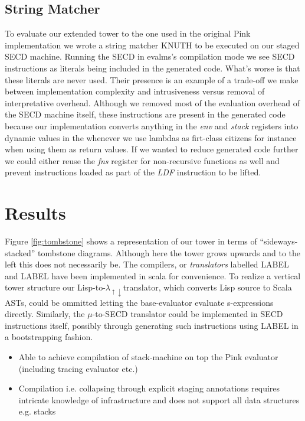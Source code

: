 \documentclass{article}
\theoremstyle{definition}
\newcommand{\mslang}{$\lambda_{\uparrow\downarrow}$}
\begin{document}
\subsection{String Matcher}
To evaluate our extended tower to the one used in the original Pink implementation we wrote a string matcher KNUTH to be executed on our staged SECD machine. Running the SECD in evalms's compilation mode we see SECD instructions as literals being included in the generated code. What's worse is that these literals are never used. Their presence is an example of a trade-off we make between implementation complexity and intrusiveness versus removal of interpretative overhead. Although we removed most of the evaluation overhead of the SECD machine itself, these instructions are present in the generated code because our implementation converts anything in the \textit{env} and \textit{stack} registers into dynamic values in the whenever we use lambdas as firt-class citizens for instance when using them as return values. If we wanted to reduce generated code further we could either reuse the \textit{fns} register for non-recursive functions as well and prevent instructions loaded as part of the \textit{LDF} instruction to be lifted.

\section{Results}
Figure \ref{fig:tombstone} shows a representation of our tower in terms of ``sideways-stacked'' tombstone diagrams. Although here the tower grows upwards and to the left this does not necessarily be. The compilers, or \textit{translators} labelled LABEL and LABEL have been implemented in scala for convenience. To realize a vertical tower structure our Lisp-to-\mslang translator, which converts Lisp source to Scala ASTs, could be ommitted letting the base-evaluator evaluate s-expressions directly. Similarly, the $\mu$-to-SECD translator could be implemented in SECD instructions itself, possibly through generating such instructions using LABEL in a bootstrapping fashion.

\begin{itemize}
	\item Able to achieve compilation of stack-machine on top the Pink evaluator (including tracing evaluator etc.)
	\item Compilation i.e. collapsing through explicit staging annotations requires intricate knowledge of infrastructure and does not support all data structures e.g. stacks
\end{itemize}
\end{document}
